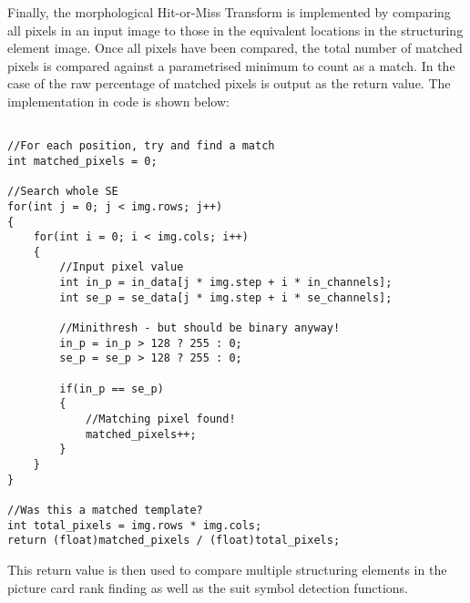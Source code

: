 			Finally, the morphological Hit-or-Miss Transform is implemented by comparing all pixels in an input image to those in the equivalent locations in the structuring element image. Once all pixels have been compared, the total number of matched pixels is compared against a parametrised minimum to count as a match. In the case of  the raw percentage of matched pixels is output as the return value. The implementation in code is shown below:

			\begin{lstlisting}

//For each position, try and find a match
int matched_pixels = 0;

//Search whole SE
for(int j = 0; j < img.rows; j++)
{
	for(int i = 0; i < img.cols; i++)
	{
		//Input pixel value
		int in_p = in_data[j * img.step + i * in_channels];
		int se_p = se_data[j * img.step + i * se_channels];

		//Minithresh - but should be binary anyway!
		in_p = in_p > 128 ? 255 : 0;
		se_p = se_p > 128 ? 255 : 0;

		if(in_p == se_p)
		{
			//Matching pixel found!
			matched_pixels++;
		}
	}
}

//Was this a matched template?
int total_pixels = img.rows * img.cols;
return (float)matched_pixels / (float)total_pixels;
			\end{lstlisting}

			This return value is then used to compare multiple structuring elements in the picture card rank finding as well as the suit symbol detection functions.